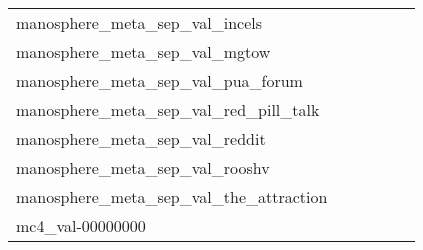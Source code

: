 {\begin{longtable}{m{6cm}m{1.7cm}m{1.7cm}m{1.7cm}m{1.7cm}m{1.7cm}}
	manosphere\_meta\_sep\_val\_incels  & \colorbox[HTML]{77c578}{\makebox[\mywidth][c]{11.26}} & \colorbox[HTML]{c3e698}{\makebox[\mywidth][c]{12.18}} & \colorbox[HTML]{ffffe5}{\makebox[\mywidth][c]{21.40}} & \colorbox[HTML]{90d082}{\makebox[\mywidth][c]{11.51}} & \colorbox[HTML]{7cc77a}{\makebox[\mywidth][c]{11.29}}\\
	manosphere\_meta\_sep\_val\_mgtow  & \colorbox[HTML]{f8fcc3}{\makebox[\mywidth][c]{24.83}} & \colorbox[HTML]{d7efa2}{\makebox[\mywidth][c]{24.27}} & \colorbox[HTML]{ffffe5}{\makebox[\mywidth][c]{27.50}} & \colorbox[HTML]{bfe596}{\makebox[\mywidth][c]{24.12}} & \colorbox[HTML]{77c578}{\makebox[\mywidth][c]{23.80}}\\
	manosphere\_meta\_sep\_val\_pua\_forum  & \colorbox[HTML]{f5fbb7}{\makebox[\mywidth][c]{24.22}} & \colorbox[HTML]{d0ec9e}{\makebox[\mywidth][c]{23.85}} & \colorbox[HTML]{ffffe5}{\makebox[\mywidth][c]{26.52}} & \colorbox[HTML]{d0ec9e}{\makebox[\mywidth][c]{23.86}} & \colorbox[HTML]{77c578}{\makebox[\mywidth][c]{23.52}}\\
	manosphere\_meta\_sep\_val\_red\_pill\_talk  & \colorbox[HTML]{fafdcd}{\makebox[\mywidth][c]{34.59}} & \colorbox[HTML]{e2f3a9}{\makebox[\mywidth][c]{33.90}} & \colorbox[HTML]{ffffe5}{\makebox[\mywidth][c]{37.26}} & \colorbox[HTML]{e2f3a9}{\makebox[\mywidth][c]{33.90}} & \colorbox[HTML]{77c578}{\makebox[\mywidth][c]{33.27}}\\
	manosphere\_meta\_sep\_val\_reddit  & \colorbox[HTML]{ffffe5}{\makebox[\mywidth][c]{20.63}} & \colorbox[HTML]{d9f0a3}{\makebox[\mywidth][c]{19.78}} & \colorbox[HTML]{ffffe5}{\makebox[\mywidth][c]{21.10}} & \colorbox[HTML]{f5fbb8}{\makebox[\mywidth][c]{19.94}} & \colorbox[HTML]{77c578}{\makebox[\mywidth][c]{19.58}}\\
	manosphere\_meta\_sep\_val\_rooshv  & \colorbox[HTML]{f7fcbb}{\makebox[\mywidth][c]{22.46}} & \colorbox[HTML]{e2f3a9}{\makebox[\mywidth][c]{22.17}} & \colorbox[HTML]{ffffe5}{\makebox[\mywidth][c]{24.78}} & \colorbox[HTML]{ccea9c}{\makebox[\mywidth][c]{22.01}} & \colorbox[HTML]{77c578}{\makebox[\mywidth][c]{21.69}}\\
	manosphere\_meta\_sep\_val\_the\_attraction  & \colorbox[HTML]{f2fab5}{\makebox[\mywidth][c]{20.85}} & \colorbox[HTML]{d7efa2}{\makebox[\mywidth][c]{20.57}} & \colorbox[HTML]{ffffe5}{\makebox[\mywidth][c]{23.17}} & \colorbox[HTML]{d7efa2}{\makebox[\mywidth][c]{20.57}} & \colorbox[HTML]{77c578}{\makebox[\mywidth][c]{20.20}}\\
	mc4\_val-00000000  & \colorbox[HTML]{cdeb9d}{\makebox[\mywidth][c]{8.35}} & \colorbox[HTML]{dcf1a5}{\makebox[\mywidth][c]{8.41}} & \colorbox[HTML]{ffffe5}{\makebox[\mywidth][c]{10.02}} & \colorbox[HTML]{a5d98b}{\makebox[\mywidth][c]{8.23}} & \colorbox[HTML]{77c578}{\makebox[\mywidth][c]{8.15}}\\

\end{longtable}}
